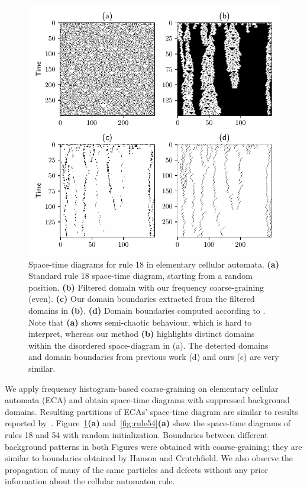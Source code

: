 \begin{figure}[th]
  \centering
  \includegraphics[width=\linewidth]{figures/rule18.pdf}
  \caption{\label{fig:rule18} Space-time diagrams for rule 18 in elementary
    cellular automata. \textbf{(a)} Standard rule 18 space-time diagram,
    starting from a random position. \textbf{(b)} Filtered domain with our
    frequency coarse-graining (even). \textbf{(c)} Our domain boundaries
    extracted from the filtered domains in \textbf{(b)}. \textbf{(d)} Domain
    boundaries computed according to
    \parencite{hansonAttractorbasinPortraitCellular1992}. Note that \textbf{(a)}
    shows semi-chaotic behaviour, which is hard to interpret, whereas our method
    \textbf{(b)} highlights distinct domains within the disordered space-diagram
    in (a). The detected domains and domain boundaries from previous work (d)
    and ours (c) are very similar.}
\end{figure}

We apply frequency histogram-based coarse-graining on elementary cellular
automata (ECA) and obtain space-time diagrams with suppressed background
domains. Resulting partitions of ECAs' space-time diagram are similar to results
reported by~\parencite{hansonAttractorbasinPortraitCellular1992,
  hansonComputationalMechanicsCellular1997}. Figure~\ref{fig:rule18}\textbf{(a)}
and~\ref{fig:rule54}\textbf{(a)} show the space-time diagrams of rules 18 and 54
with random initialization. Boundaries between different background patterns in
both Figures were obtained with coarse-graining; they are similar to boundaries
obtained by Hanson and Crutchfield. We also observe the propagation of many of
the same particles and defects without any prior information about the cellular
automaton rule.

